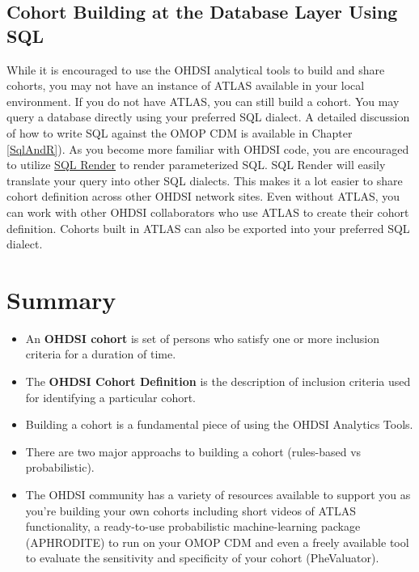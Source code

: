 \documentclass[11pt]{book}
\providecommand{\tightlist}{%
  \setlength{\itemsep}{0pt}\setlength{\parskip}{0pt}}
\theoremstyle{definition}
\theoremstyle{definition}
\theoremstyle{definition}
\theoremstyle{remark}
\let\BeginKnitrBlock\begin \let\EndKnitrBlock\end
\begin{document}
\hypertarget{cohort-building-at-the-database-layer-using-sql}{%
\subsection{Cohort Building at the Database Layer Using SQL}\label{cohort-building-at-the-database-layer-using-sql}}

While it is encouraged to use the OHDSI analytical tools to build and share cohorts, you may not have an instance of ATLAS available in your local environment. If you do not have ATLAS, you can still build a cohort. You may query a database directly using your preferred SQL dialect. A detailed discussion of how to write SQL against the OMOP CDM is available in Chapter \ref{SqlAndR}). As you become more familiar with OHDSI code, you are encouraged to utilize \href{https://github.com/OHDSI/SqlRender}{SQL Render} to render parameterized SQL. SQL Render will easily translate your query into other SQL dialects. This makes it a lot easier to share cohort definition across other OHDSI network sites. Even without ATLAS, you can work with other OHDSI collaborators who use ATLAS to create their cohort definition. Cohorts built in ATLAS can also be exported into your preferred SQL dialect.

\hypertarget{summary-7}{%
\section{Summary}\label{summary-7}}

\BeginKnitrBlock{rmdsummary}
\begin{itemize}
\tightlist
\item
  An \textbf{OHDSI cohort} is set of persons who satisfy one or more inclusion criteria for a duration of time.
\item
  The \textbf{OHDSI Cohort Definition} is the description of inclusion criteria used for identifying a particular cohort.
\item
  Building a cohort is a fundamental piece of using the OHDSI Analytics Tools.
\item
  There are two major approachs to building a cohort (rules-based vs probabilistic).
\item
  The OHDSI community has a variety of resources available to support you as you're building your own cohorts including short videos of ATLAS functionality, a ready-to-use probabilistic machine-learning package (APHRODITE) to run on your OMOP CDM and even a freely available tool to evaluate the sensitivity and specificity of your cohort (PheValuator).
\end{itemize}
\EndKnitrBlock{rmdsummary}
\end{document}

